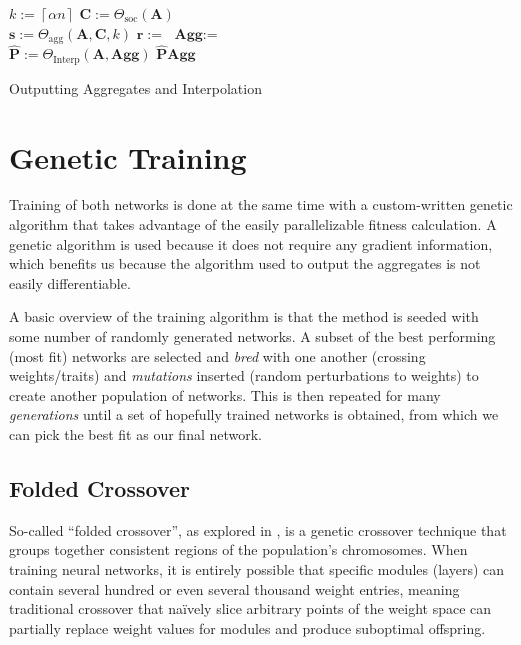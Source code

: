 \documentclass{article}
\newcommand{\mat}[1]{\bm{{#1}}}
\renewcommand{\vec}[1]{\bm{{#1}}}
\newcommand{\ceil}[1]{\left\lceil #1 \right\rceil}
\begin{document}
\begin{algorithm}
  \begin{algorithmic}
    \Procedure{FullAggNet}{$\mat{A}\in\mathbb{R}^{n \times n}, \alpha$}
    \State $k := \ceil{\alpha n}$ 
    \State $\mat{C} := \Theta_{\text{soc}}\left(\mat{A}\right)$ 
    \\
    \State $\vec{s} := \Theta_{\text{agg}}\left(\mat{A}, \mat{C}, k\right)$ 
    \State $\vec{r} := $ \Call{top-k}{$\vec{s}, k$} 
    \State $\mat{\text{Agg}} := $ \Call{Bellman-Ford}{$\mat{C}, \vec{r}$} 
    \\
    \State $\mat{\hat{P}} := \Theta_{\text{Interp}}\left(\mat{A}, \mat{\text{Agg}}\right)$ 
    \State \Return $\mat{\hat{P}} \mat{\text{Agg}}$ 
    \EndProcedure
  \end{algorithmic}
  \caption{Outputting Aggregates and Interpolation}
  \label{alg:algo}
\end{algorithm}

\section{Genetic Training}
Training of both networks is done at the same time with a custom-written genetic algorithm that takes advantage of the easily parallelizable fitness calculation.  A genetic algorithm is used because it does not require any gradient information, which benefits us because the algorithm used to output the aggregates is not easily differentiable.

A basic overview of the training algorithm is that the method is seeded with some number of randomly generated networks. A subset of the best performing (most fit) networks are selected and \textit{bred} with one another (crossing weights/traits) and \textit{mutations} inserted (random perturbations to weights) to create another population of networks.  This is then repeated for many \textit{generations} until a set of hopefully trained networks is obtained, from which we can pick the best fit as our final network.

\subsection{Folded Crossover}
So-called ``folded crossover'', as explored in \cite{GA_CNN}, is a genetic crossover technique that groups together consistent regions of the population's chromosomes.  When training neural networks, it is entirely possible that specific modules (layers) can contain several hundred or even several thousand weight entries, meaning traditional crossover that na\"ively slice arbitrary points of the weight space can partially replace weight values for modules and produce suboptimal offspring.
\end{document}
